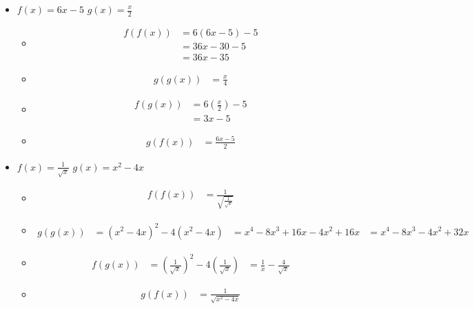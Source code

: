 \documentclass[journal,onecolumn,10pt,fleqn]{IEEEtran}%
\theoremstyle{break}                                            %
\begin{document}
\begin{itemize}
  \item 
  $f(x) = 6x - 5$
  $g(x) = \frac{x}{2}$

  \begin{itemize}
    \item
    \begin{align*}
      f(f(x))
        &= 6(6x - 5) - 5 \\
        &= 36x - 30 - 5 \\
        &= 36x - 35
    \end{align*}
    \item
    \begin{align*}
      g(g(x))
        &= \frac{x}{4}
    \end{align*}
    \item
    \begin{align*}
      f(g(x))
        &= 6(\frac{x}{2}) - 5 \\
        &= 3x - 5
    \end{align*}

    \item
    \begin{align*}
      g(f(x))
        &= \frac{6x - 5}{2}
    \end{align*}
  \end{itemize}

  \item 
  $f(x) = \frac{1}{\sqrt{x}}$
  $g(x) = x^2 - 4x$

  \begin{itemize}
    \item
    \begin{align*}
      f(f(x))
        &= \frac{1}{\sqrt{\frac{1}{\sqrt{x}}}}
    \end{align*}
    \item
    \begin{align*}
      g(g(x))
        &= (x^2 - 4x)^2 - 4(x^2 - 4x)
        &= x^4 - 8x^3 + 16x - 4x^2 + 16x
        &= x^4 - 8x^3 - 4x^2 + 32x
    \end{align*}
    \item
    \begin{align*}
      f(g(x))
        &= (\frac{1}{\sqrt{x}})^2 - 4(\frac{1}{\sqrt{x}})
        &= \frac{1}{x} - \frac{4}{\sqrt{x}}
    \end{align*}

    \item
    \begin{align*}
      g(f(x))
        &= \frac{1}{\sqrt{x^2 - 4x}}
    \end{align*}
  \end{itemize}

\end{itemize}
\end{document}
